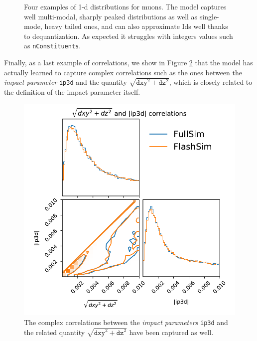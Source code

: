 \begin{figure}
    \caption[1-d muons distributions]{Four examples of 1-d distributions for muons. The model captures well multi-modal, sharply peaked distributions as well as single-mode, heavy tailed ones, and can also approximate Ids well thanks to dequantization. As expected it struggles with integers values such as \texttt{nConstituents}.}\label{fig:muonsdists}
    
\end{figure}

Finally, as a last example of correlations, we show in Figure \ref{fig:corrmuons} that the model has actually learned to capture complex correlations such as the ones between the \emph{impact parameter} \texttt{ip3d} and the quantity $\sqrt{\texttt{dxy}^2 + \texttt{dz}^2}$, which is closely related to the definition of the impact parameter itself.

\begin{figure}
    \centering
    \includegraphics[scale=0.6]{gfx/ch5/mcorrs.pdf}
    \caption[Muons correlations]{The complex correlations between the \emph{impact parameters} \texttt{ip3d} and the related quantity $\sqrt{\texttt{dxy}^2 + \texttt{dz}^2}$ have been captured as well.}
    \label{fig:corrmuons}
\end{figure}


